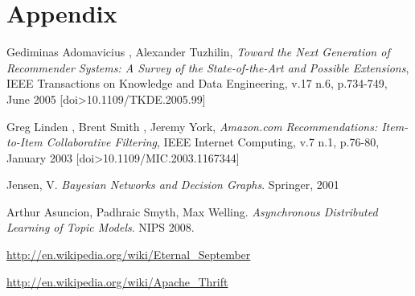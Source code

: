\documentclass[11pt,letterpaper]{article}
\begin{document}
\section{Appendix}

\newpage
\newpage
\begin{thebibliography}{6}
   Gediminas Adomavicius , Alexander Tuzhilin, \textit{Toward the Next Generation of Recommender Systems: A Survey of the State-of-the-Art and Possible Extensions}, IEEE Transactions on Knowledge and Data Engineering, v.17 n.6, p.734-749, June 2005  [doi>10.1109/TKDE.2005.99]

   Greg Linden , Brent Smith , Jeremy York, \textit{Amazon.com Recommendations: Item-to-Item Collaborative Filtering}, IEEE Internet Computing, v.7 n.1, p.76-80, January 2003  [doi>10.1109/MIC.2003.1167344]

   Jensen, V. \textit{Bayesian Networks and Decision Graphs}. Springer, 2001

   Arthur Asuncion, Padhraic Smyth, Max Welling. \textit{Asynchronous Distributed Learning of Topic Models}. NIPS 2008.

   \url{http://en.wikipedia.org/wiki/Eternal\_September}

   \url{http://en.wikipedia.org/wiki/Apache\_Thrift}

\end{thebibliography}
\end{document}
